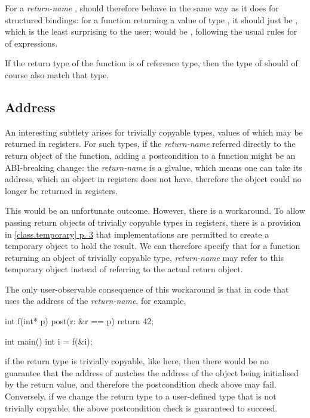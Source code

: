 For a \emph{return-name} ,  should therefore behave in the same way as it does for structured bindings: for a function returning a value of type , it should just be , which is the least surprising to the user;  would be , following the usual rules for  of expressions.

If the return type of the function is of reference type, then the type of  should of course also match that type.

\subsection{Address}

An interesting subtlety arises for trivially copyable types, values of which may be returned in registers. For such types, if the \emph{return-name} referred directly to the return object of the function, adding a postcondition to a function might be an ABI-breaking change: the \emph{return-name} is a glvalue, which means one can take its address, which an object in registers does not have, therefore the object could no longer be returned in registers.

This would be an unfortunate outcome. However, there is a workaround. To allow passing return objects of trivially copyable types in registers, there is a provision in \href{https://eel.is/c++draft/class.temporary#3}{[class.temporary] p. 3} that implementations are permitted to create a temporary object to hold the result. We can therefore specify that for a function returning an object of trivially copyable type, \emph{return-name} may refer to this temporary object instead of referring to the actual return object.

The only user-observable consequence of this workaround is that in code that uses the address of the \emph{return-name}, for example,

\begin{codeblock}
int f(int* p)
  post(r: &r == p)
{
  return 42;
}

int main() {
  int i = f(&i);
}
\end{codeblock}

if the return type is trivially copyable, like  here, then there would be no guarantee that the address of  matches the address of the object being initialised by the return value, and therefore the postcondition check above may fail. Conversely, if we change the return type to a user-defined type that is not trivially copyable, the above postcondition check is guaranteed to succeed.

